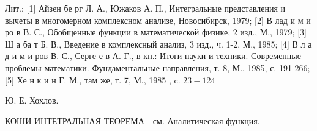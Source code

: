 \documentclass[10pt]{article}
\begin{document}
Лит.: [1] Айзен бе рг Л. А., Южаков А. П., Интегральные представления и вычеты в многомерном комплексном анализе, Новосибирск, 1979; [2] В лад и м и ро в В. С., Обобщенные функции в математической физике, 2 изд., М., 1979; [3] Ш а ба т Б. В., Введение в комплексный анализ, 3 изд., ч. 1-2, М., 1985; [4] В л а д и м и ров В. С., Серге е в А. Г., в кн.: Итоги науки и техники. Современные проблемы математики. Фундаментальные направления, т. 8, М., 1985, с. 191-266; [5] Хе н к и н Г. М., там же, т. 7, М., 1985 , c. $23-124$



Ю. Е. Хохлов.



КОШИ ИНТЕТРАЛЬНАЯ ТЕОРЕМА - см. Аналитическая функция.
\end{document}
